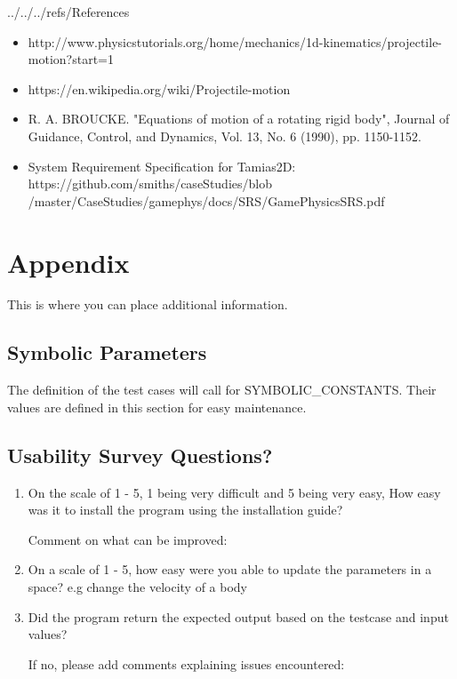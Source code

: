 \documentclass[12pt, titlepage]{article}
\newcommand{\progname}{Tamias2D}
\begin{document}
 {../../../refs/References}
\begin{itemize}
\item{http://www.physicstutorials.org/home/mechanics/1d-kinematics/projectile-motion?start=1}
\item{https://en.wikipedia.org/wiki/Projectile-motion}
\item{R. A. BROUCKE.  "Equations of motion of a rotating rigid body", Journal of Guidance, Control, and Dynamics, Vol. 13, No. 6 (1990), pp. 1150-1152.}
\item{System Requirement Specification for \progname{}: https://github.com/smiths/caseStudies/blob
	/master/CaseStudies/gamephys/docs/SRS/GamePhysicsSRS.pdf}

\end{itemize}


\newpage

\section{Appendix}

This is where you can place additional information.

\subsection{Symbolic Parameters}

The definition of the test cases will call for SYMBOLIC\_CONSTANTS.
Their values are defined in this section for easy maintenance.

\subsection{Usability Survey Questions?}

\begin{enumerate}

\item {On the scale of 1 - 5, 1 being very difficult and 5 being very easy, How easy was it to install the program using the installation guide?

Comment on what can be improved:}

\item On a scale of 1 - 5, how easy were you able to update the parameters in a space? e.g change the velocity of a body

\item Did the program return the expected output based on the testcase and input values? 

If no, please add comments explaining issues encountered:


\end{enumerate}
\end{document}
